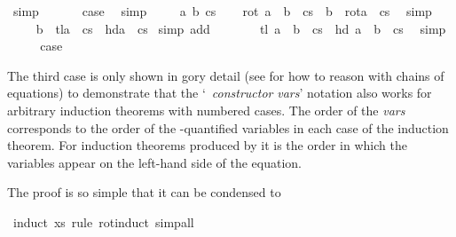 \begin{isabellebody}
\ simp\isanewline
\isamarkupfalse%
\isanewline
\ \ \isamarkupfalse%
\ {}\ \isamarkupfalse%
\ {\isacharquery}case\ \isamarkupfalse%
\ simp\isanewline
\isamarkupfalse%
\isanewline
\ \ \isamarkupfalse%
\ {\isacharparenleft}{}\ a\ b\ cs{\isacharparenright}\isanewline
\ \ \isamarkupfalse%
\ {\isachardoublequote}rot\ {\isacharparenleft}a\ {\isacharhash}\ b\ {\isacharhash}\ cs{\isacharparenright}\ {\isacharequal}\ b\ {\isacharhash}\ rot{\isacharparenleft}a\ {\isacharhash}\ cs{\isacharparenright}{\isachardoublequote}\ \isamarkupfalse%
\ simp\isanewline
\ \ \isamarkupfalse%
\ \isamarkupfalse%
\ {\isachardoublequote}{\isasymdots}\ {\isacharequal}\ b\ {\isacharhash}\ tl{\isacharparenleft}a\ {\isacharhash}\ cs{\isacharparenright}\ {\isacharat}\ {\isacharbrackleft}hd{\isacharparenleft}a\ {\isacharhash}\ cs{\isacharparenright}{\isacharbrackright}{\isachardoublequote}\ \isamarkupfalse%
simp\ add{\isacharcolon}{}{\isacharparenright}\isanewline
\ \ \isamarkupfalse%
\ \isamarkupfalse%
\ {\isachardoublequote}{\isasymdots}\ {\isacharequal}\ tl\ {\isacharparenleft}a\ {\isacharhash}\ b\ {\isacharhash}\ cs{\isacharparenright}\ {\isacharat}\ {\isacharbrackleft}hd\ {\isacharparenleft}a\ {\isacharhash}\ b\ {\isacharhash}\ cs{\isacharparenright}{\isacharbrackright}{\isachardoublequote}\ \isamarkupfalse%
\ simp\isanewline
\ \ \isamarkupfalse%
\ \isamarkupfalse%
\ {\isacharquery}case\ \isamarkupfalse%
\isacommand{{\isachardot}}\isanewline
\isamarkupfalse%
%
\endisatagproof
{\isafoldproof}%
%
\isadelimproof
%
\endisadelimproof
\isamarkuptrue%
%
\begin{isamarkuptext}%
\noindent
The third case is only shown in gory detail (see \cite{BauerW-TPHOLs01}
for how to reason with chains of equations) to demonstrate that the
`~\isa{(}\emph{constructor} \emph{vars}\isa{)}' notation also
works for arbitrary induction theorems with numbered cases. The order
of the \emph{vars} corresponds to the order of the
\isa{{\isasymAnd}}-quantified variables in each case of the induction
theorem. For induction theorems produced by  it is
the order in which the variables appear on the left-hand side of the
equation.

The proof is so simple that it can be condensed to%
\end{isamarkuptext}%
%
\isadelimproof
%
\endisadelimproof
%
\isatagproof
\isamarkupfalse%
\ {\isacharparenleft}induct\ xs\ rule{\isacharcolon}\ rot{\isachardot}induct{\isacharcomma}\ simp{\isacharunderscore}all{\isacharparenright}\isanewline
%
\endisatagproof
{\isafoldproof}%
%
\isadelimproof
%
\endisadelimproof
%
\isadelimtheory
%
\endisadelimtheory
%
\isatagtheory
%
\endisatagtheory
{\isafoldtheory}%
%
\isadelimtheory
%
\endisadelimtheory
\end{isabellebody}%
